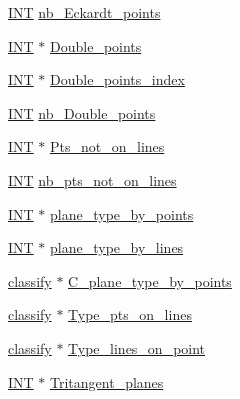 \begin{DoxyCompactItemize}
\item 
\mbox{\hyperlink{galois_8h_a09fddde158a3a20bd2dcadb609de11dc}{I\+NT}} \mbox{\hyperlink{classsurface__object_a26375d6fb1195310d309c28b47dcbd72}{nb\+\_\+\+Eckardt\+\_\+points}}
\item 
\mbox{\hyperlink{galois_8h_a09fddde158a3a20bd2dcadb609de11dc}{I\+NT}} $\ast$ \mbox{\hyperlink{classsurface__object_a996a56d69d65da3477ac7e87d0f3def0}{Double\+\_\+points}}
\item 
\mbox{\hyperlink{galois_8h_a09fddde158a3a20bd2dcadb609de11dc}{I\+NT}} $\ast$ \mbox{\hyperlink{classsurface__object_a3a153a0199e5d721597f0474eccc18bb}{Double\+\_\+points\+\_\+index}}
\item 
\mbox{\hyperlink{galois_8h_a09fddde158a3a20bd2dcadb609de11dc}{I\+NT}} \mbox{\hyperlink{classsurface__object_a02c107359dfab111b38d38dd5e8dad5d}{nb\+\_\+\+Double\+\_\+points}}
\item 
\mbox{\hyperlink{galois_8h_a09fddde158a3a20bd2dcadb609de11dc}{I\+NT}} $\ast$ \mbox{\hyperlink{classsurface__object_acf56a8ed4faee4ba1cf0b22889df70d2}{Pts\+\_\+not\+\_\+on\+\_\+lines}}
\item 
\mbox{\hyperlink{galois_8h_a09fddde158a3a20bd2dcadb609de11dc}{I\+NT}} \mbox{\hyperlink{classsurface__object_abc79e4d403d07c4b9b8042ea1c57a078}{nb\+\_\+pts\+\_\+not\+\_\+on\+\_\+lines}}
\item 
\mbox{\hyperlink{galois_8h_a09fddde158a3a20bd2dcadb609de11dc}{I\+NT}} $\ast$ \mbox{\hyperlink{classsurface__object_a1970c960a6a67bfd3df36cfe814e35d4}{plane\+\_\+type\+\_\+by\+\_\+points}}
\item 
\mbox{\hyperlink{galois_8h_a09fddde158a3a20bd2dcadb609de11dc}{I\+NT}} $\ast$ \mbox{\hyperlink{classsurface__object_aca45161ecfdee5980838794d8f4caacc}{plane\+\_\+type\+\_\+by\+\_\+lines}}
\item 
\mbox{\hyperlink{classclassify}{classify}} $\ast$ \mbox{\hyperlink{classsurface__object_ae899e026c3a96402f63c4e5bcb6f0a53}{C\+\_\+plane\+\_\+type\+\_\+by\+\_\+points}}
\item 
\mbox{\hyperlink{classclassify}{classify}} $\ast$ \mbox{\hyperlink{classsurface__object_a676fd81765543f6198ee3e5acdc863ca}{Type\+\_\+pts\+\_\+on\+\_\+lines}}
\item 
\mbox{\hyperlink{classclassify}{classify}} $\ast$ \mbox{\hyperlink{classsurface__object_a0184e0304e880008fa802b4ea80d965d}{Type\+\_\+lines\+\_\+on\+\_\+point}}
\item 
\mbox{\hyperlink{galois_8h_a09fddde158a3a20bd2dcadb609de11dc}{I\+NT}} $\ast$ \mbox{\hyperlink{classsurface__object_a8e0217bf0f07b82f7524df4a355cfc39}{Tritangent\+\_\+planes}}

\end{DoxyCompactItemize}

